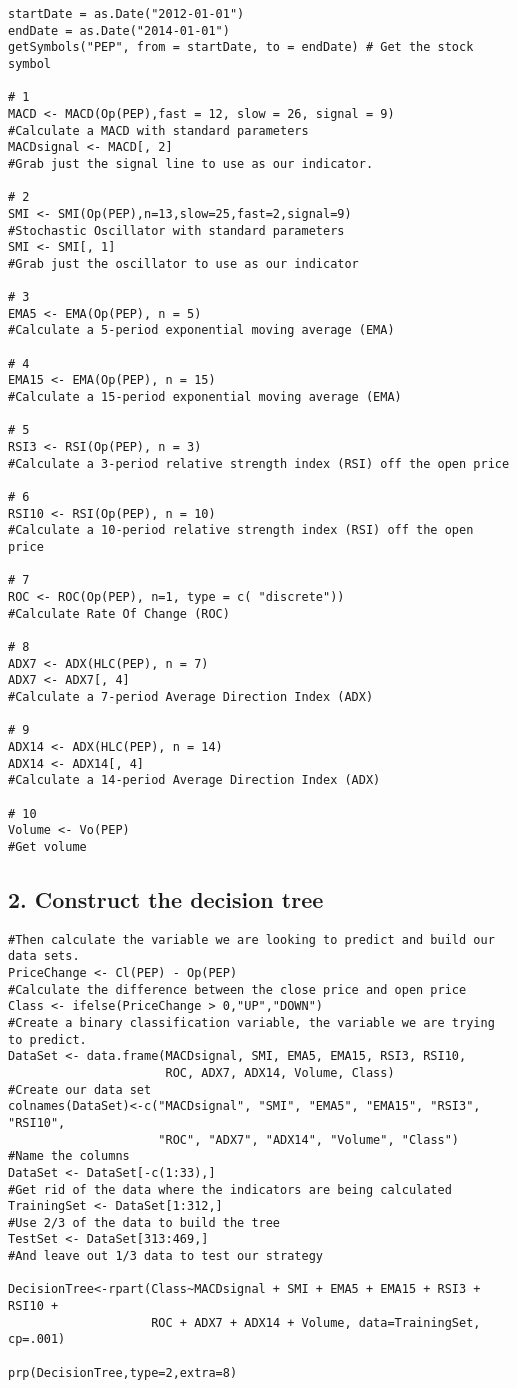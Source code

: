 \documentclass{article}
\begin{document}
\begin{verbatim}
startDate = as.Date("2012-01-01")
endDate = as.Date("2014-01-01")
getSymbols("PEP", from = startDate, to = endDate) # Get the stock symbol

# 1 
MACD <- MACD(Op(PEP),fast = 12, slow = 26, signal = 9)
#Calculate a MACD with standard parameters
MACDsignal <- MACD[, 2]
#Grab just the signal line to use as our indicator.

# 2
SMI <- SMI(Op(PEP),n=13,slow=25,fast=2,signal=9) 
#Stochastic Oscillator with standard parameters
SMI <- SMI[, 1]
#Grab just the oscillator to use as our indicator

# 3
EMA5 <- EMA(Op(PEP), n = 5)
#Calculate a 5-period exponential moving average (EMA)

# 4
EMA15 <- EMA(Op(PEP), n = 15)
#Calculate a 15-period exponential moving average (EMA)

# 5
RSI3 <- RSI(Op(PEP), n = 3)
#Calculate a 3-period relative strength index (RSI) off the open price

# 6
RSI10 <- RSI(Op(PEP), n = 10)
#Calculate a 10-period relative strength index (RSI) off the open price

# 7
ROC <- ROC(Op(PEP), n=1, type = c( "discrete"))
#Calculate Rate Of Change (ROC)

# 8
ADX7 <- ADX(HLC(PEP), n = 7)
ADX7 <- ADX7[, 4]
#Calculate a 7-period Average Direction Index (ADX)

# 9
ADX14 <- ADX(HLC(PEP), n = 14)
ADX14 <- ADX14[, 4]
#Calculate a 14-period Average Direction Index (ADX)

# 10
Volume <- Vo(PEP)
#Get volume
\end{verbatim}

\subsection*{2. Construct the decision tree}
\begin{verbatim}
#Then calculate the variable we are looking to predict and build our data sets.
PriceChange <- Cl(PEP) - Op(PEP)
#Calculate the difference between the close price and open price
Class <- ifelse(PriceChange > 0,"UP","DOWN")
#Create a binary classification variable, the variable we are trying to predict.
DataSet <- data.frame(MACDsignal, SMI, EMA5, EMA15, RSI3, RSI10, 
                      ROC, ADX7, ADX14, Volume, Class)
#Create our data set
colnames(DataSet)<-c("MACDsignal", "SMI", "EMA5", "EMA15", "RSI3", "RSI10", 
                     "ROC", "ADX7", "ADX14", "Volume", "Class") 
#Name the columns
DataSet <- DataSet[-c(1:33),]
#Get rid of the data where the indicators are being calculated
TrainingSet <- DataSet[1:312,]
#Use 2/3 of the data to build the tree
TestSet <- DataSet[313:469,]
#And leave out 1/3 data to test our strategy

DecisionTree<-rpart(Class~MACDsignal + SMI + EMA5 + EMA15 + RSI3 +  RSI10 + 
                    ROC + ADX7 + ADX14 + Volume, data=TrainingSet, cp=.001)

prp(DecisionTree,type=2,extra=8)
\end{verbatim}
\end{document}
